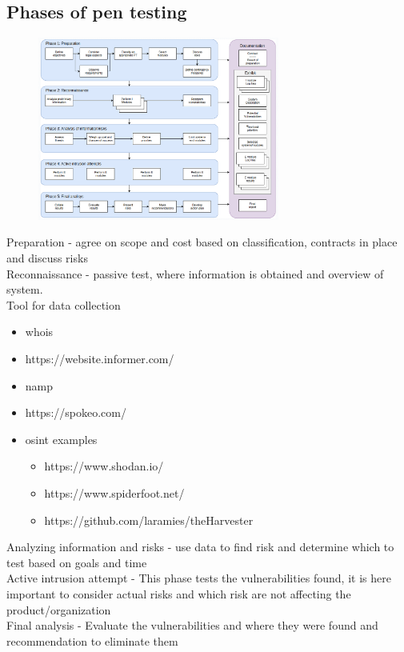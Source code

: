 \documentclass[12pt, a4paper]{article}
\begin{document}
		\subsection{Phases of pen testing}
			\begin{figure}[h!]
				\centering
				\includegraphics[width=300px]{assets/penPhases.png}
			\end{figure}
			Preparation - agree on scope and cost based on classification, contracts in place and discuss risks\\
			Reconnaissance - passive test, where information is obtained and overview of system.\\
			Tool for data collection
			\begin{itemize}
				\item whois
				\item https://website.informer.com/
				\item namp 
				\item https://spokeo.com/
				\item osint examples 
				\begin{itemize}
					\item https://www.shodan.io/
					\item https://www.spiderfoot.net/
					\item https://github.com/laramies/theHarvester
				\end{itemize}
			\end{itemize}
			Analyzing information and risks - use data to find risk and determine which to test based on goals and time\\
			Active intrusion attempt - This phase tests the vulnerabilities found, it is here important to consider actual risks and which risk are not affecting the product/organization\\
			Final analysis - Evaluate the vulnerabilities and where they were found and recommendation to eliminate them\\
\end{document}
